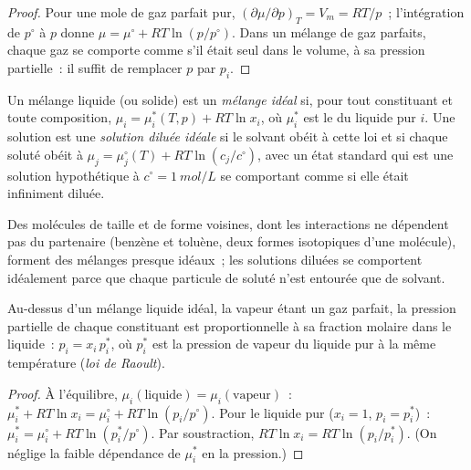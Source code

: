 \begin{proof}
Pour une mole de gaz parfait pur, $(\partial\mu/\partial p)_T = V_m =
RT/p$~; l'intégration de $p^\circ$ à $p$ donne $\mu = \mu^\circ + RT\ln(p/p^\circ)$.
Dans un mélange de gaz parfaits, chaque gaz se comporte comme s'il était seul dans le volume, à
sa pression partielle~: il suffit de remplacer $p$ par $p_i$.
\end{proof}

\begin{definition}\label{def:b2:chemical-potential:ideal-mixture}
Un mélange liquide (ou solide) est un \emph{mélange idéal}
si, pour tout constituant et toute composition,
$\mu_i = \mu_i^*(T, p) + RT\ln x_i$, où $\mu_i^*$ est le 
du liquide pur $i$. Une solution est une \emph{solution diluée
idéale} si le solvant obéit à cette loi et si chaque
soluté obéit à $\mu_j = \mu_j^\circ(T) + RT\ln(c_j/c^\circ)$, avec un état
standard qui est une solution hypothétique à $c^\circ = \qty{1}{mol/L}$ se comportant
comme si elle était infiniment diluée.
\end{definition}

Des molécules de taille et de forme voisines, dont les interactions ne dépendent pas
du partenaire (benzène et toluène, deux formes isotopiques d'une molécule), forment
des mélanges presque idéaux~; les solutions diluées se comportent idéalement parce que chaque particule
de soluté n'est entourée que de solvant.

\begin{theorem}\label{thm:b2:chemical-potential:raoult}
Au-dessus d'un mélange liquide idéal, la vapeur étant un gaz parfait, la pression
partielle de chaque constituant est proportionnelle à sa fraction molaire dans le
liquide~: $p_i = x_i\,p_i^*$, où $p_i^*$ est la pression de vapeur du liquide
pur à la même température (\emph{loi de Raoult}).
\end{theorem}

\begin{proof}
À l'équilibre, $\mu_i(\text{liquide}) = \mu_i(\text{vapeur})$~: $\mu_i^* +
RT\ln x_i = \mu_i^\circ + RT\ln(p_i/p^\circ)$. Pour le liquide pur ($x_i = 1$,
$p_i = p_i^*$)~: $\mu_i^* = \mu_i^\circ + RT\ln(p_i^*/p^\circ)$. Par soustraction,
$RT\ln x_i = RT\ln(p_i/p_i^*)$. (On néglige la faible dépendance de $\mu_i^*$ en
la pression.)
\end{proof}

